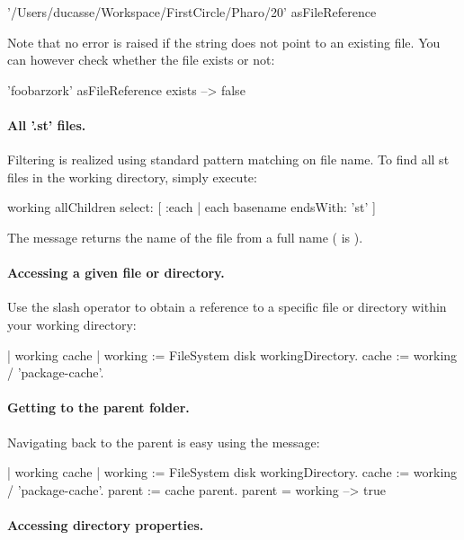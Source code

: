 \documentclass[a4paper,10pt,twoside]{book}
\begin{document}
\begin{code}{}
'/Users/ducasse/Workspace/FirstCircle/Pharo/20' asFileReference
\end{code}

Note that no error is raised if the string does not point to an existing file. You can however check whether the file exists or not:
\begin{code}{}
'foobarzork' asFileReference exists
--> false
\end{code}


\paragraph{All '.st' files.}
Filtering is realized using standard pattern matching on file name. To find all st files in the working directory, simply execute:

\begin{code}{}
working allChildren select: [ :each | each basename endsWith: 'st' ]
\end{code} 

The  message returns the name of the file from a full name (\ie  {} is ).
 
\paragraph{Accessing a given file or directory.}
Use the slash operator to obtain a reference to a specific file or directory within your working directory:

\begin{code}{}
| working cache |
working := FileSystem disk workingDirectory.
cache := working / 'package-cache'.
\end{code} 

\paragraph{Getting to the parent folder.}
Navigating back to the parent is easy using the  message:

\begin{code}{}
| working cache |
working := FileSystem disk workingDirectory.
cache := working / 'package-cache'.
parent := cache parent.
parent = working			
--> true
\end{code}

\paragraph{Accessing directory properties.}
\end{document}
